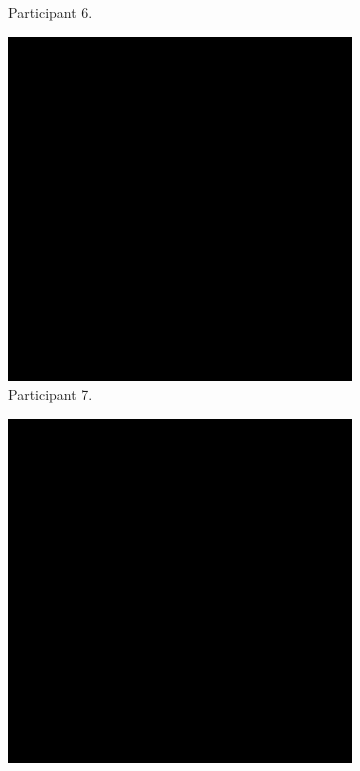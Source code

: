 \begin{figure}[!ht]
\begin{subfigure}[b]{0.24\textwidth}
        \caption{Participant 6.}
    \end{subfigure}
    \hfill    
    \begin{subfigure}[b]{0.24\textwidth}
        \centering
        \includegraphics[width=\textwidth]{img/data/Panel17/single/7.png}
        \caption{Participant 7.}
    \end{subfigure}
    \hfill    
    \begin{subfigure}[b]{0.24\textwidth}
        \centering
        \includegraphics[width=\textwidth]{img/data/Panel17/single/8.png}

\end{subfigure}
\end{figure}
